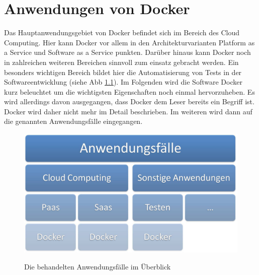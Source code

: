\chapter{Anwendungen von Docker}
\label{cha:anwendungen_von_docker}
Das Hauptanwendungsgebiet von Docker befindet sich im Bereich des Cloud Computing. Hier kann Docker vor allem in den Architekturvarianten Platform as a Service und Software as a Service punkten. Darüber hinaus kann Docker noch in zahlreichen weiteren Bereichen sinnvoll zum einsatz gebracht werden. Ein besonders wichtigen Bereich bildet hier die Automatisierung von Tests in der Softwareentwicklung (siehe Abb \ref{fig:anwendungsfaelle}).
Im Folgenden wird die Software Docker kurz beleuchtet um die wichtigsten Eigenschaften noch einmal hervorzuheben. Es wird allerdings davon ausgegangen, dass Docker dem Leser bereits ein Begriff ist. Docker wird daher nicht mehr im Detail beschrieben. Im weiteren wird dann auf die genannten Anwendungsfälle eingegangen.
\begin{figure}[htbp]
  \centering  
  \includegraphics[scale=0.7]{img/anwaendungsfaelle.jpg}\\
  \caption{Die behandelten Anwendungsfälle im Überblick}
  \label{fig:anwendungsfaelle}
\end{figure}

